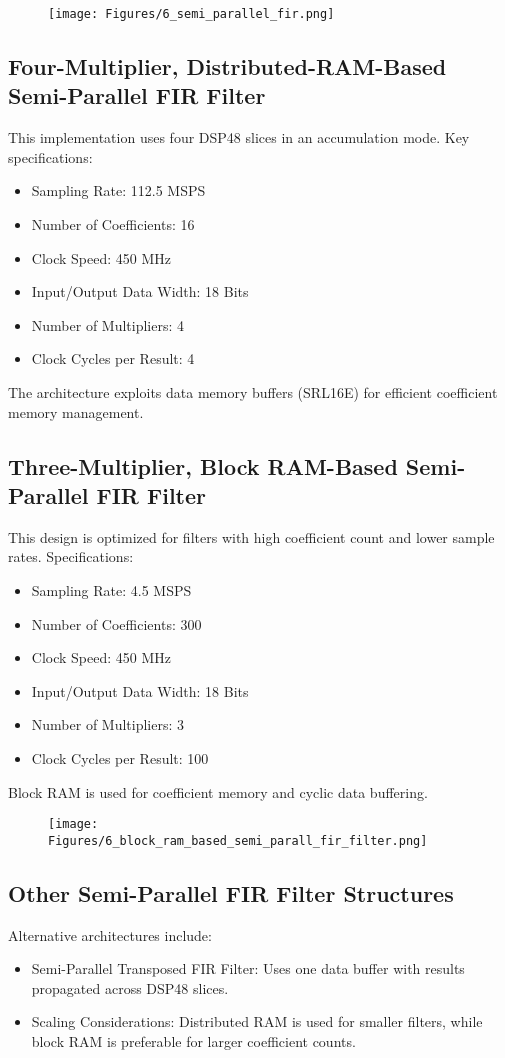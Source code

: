 \documentclass{article}
\begin{document}
	\begin{figure}
		\centering
		\texttt{[image: Figures/6\_semi\_parallel\_fir.png]}
		\label{fig:enter-label}
	\end{figure}
	
	\subsection{Four-Multiplier, Distributed-RAM-Based Semi-Parallel FIR Filter}
	This implementation uses four DSP48 slices in an accumulation mode. Key specifications:
	\begin{itemize}
		\item Sampling Rate: 112.5 MSPS
		\item Number of Coefficients: 16
		\item Clock Speed: 450 MHz
		\item Input/Output Data Width: 18 Bits
		\item Number of Multipliers: 4
		\item Clock Cycles per Result: 4
	\end{itemize}
	The architecture exploits data memory buffers (SRL16E) for efficient coefficient memory management.
	
	\subsection{Three-Multiplier, Block RAM-Based Semi-Parallel FIR Filter}
	This design is optimized for filters with high coefficient count and lower sample rates. Specifications:
	\begin{itemize}
		\item Sampling Rate: 4.5 MSPS
		\item Number of Coefficients: 300
		\item Clock Speed: 450 MHz
		\item Input/Output Data Width: 18 Bits
		\item Number of Multipliers: 3
		\item Clock Cycles per Result: 100
	\end{itemize}
	Block RAM is used for coefficient memory and cyclic data buffering.
	
	\begin{figure}
		\centering
		\texttt{[image: Figures/6\_block\_ram\_based\_semi\_parall\_fir\_filter.png]}
		\label{fig:enter-label}
	\end{figure}
	
	\subsection{Other Semi-Parallel FIR Filter Structures}
	Alternative architectures include:
	\begin{itemize}
		\item Semi-Parallel Transposed FIR Filter: Uses one data buffer with results propagated across DSP48 slices.
		\item Scaling Considerations: Distributed RAM is used for smaller filters, while block RAM is preferable for larger coefficient counts.
	\end{itemize}
	
\end{document}
